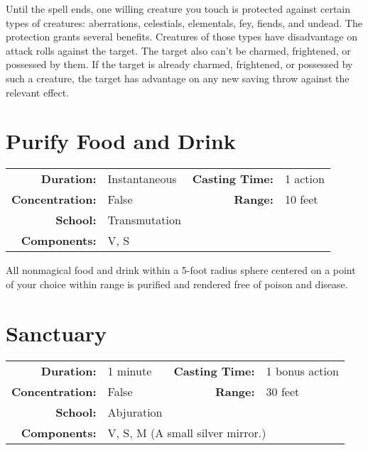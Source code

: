 \documentclass[a5paper, 12pt]{memoir}
\begin{document}
\vspace{1\baselineskip}\noindent Until the spell ends, one willing creature you touch is protected against certain types of creatures: aberrations, celestials, elementals, fey, fiends, and undead. The protection grants several benefits. Creatures of those types have disadvantage on attack rolls against the target. The target also can't be charmed, frightened, or possessed by them. If the target is already charmed, frightened, or possessed by such a creature, the target has advantage on any new saving throw against the relevant effect.

\newpage
\section*{Purify Food and Drink}

{
\small\centering\vspace{-6pt}
\begin{tabular}{rlrl}
\toprule

\textbf{Duration:} & Instantaneous &
\textbf{Casting Time:} & 1 action \\
\textbf{Concentration:} & False &
\textbf{Range:} & 10 feet \\
\textbf{School:} & Transmutation \\
\textbf{Components:} & \multicolumn{3}{p{0.7\textwidth}}{V, S}\\

\bottomrule
\end{tabular}
}

\vspace{1\baselineskip}\noindent All nonmagical food and drink within a 5-foot radius sphere centered on a point of your choice within range is purified and rendered free of poison and disease.

\newpage
\section*{Sanctuary}

{
\small\centering\vspace{-6pt}
\begin{tabular}{rlrl}
\toprule

\textbf{Duration:} & 1 minute &
\textbf{Casting Time:} & 1 bonus action \\
\textbf{Concentration:} & False &
\textbf{Range:} & 30 feet \\
\textbf{School:} & Abjuration \\
\textbf{Components:} & \multicolumn{3}{p{0.7\textwidth}}{V, S, M (A small silver mirror.)}\\

\bottomrule
\end{tabular}
}
\end{document}
